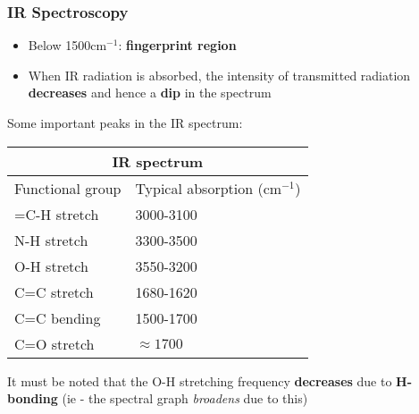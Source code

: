 \documentclass[a4paper]{article}
\begin{document}
\subsubsection{IR Spectroscopy}
\begin{itemize}
    \item Below 1500$\text{cm}^{-1}$: \textbf{fingerprint region}
    \item When IR radiation is absorbed, the intensity of transmitted radiation \textbf{decreases} and hence a \textbf{dip} in the spectrum
\end{itemize}
Some important peaks in the IR spectrum:
\begin{center}
        \begin{tabular}{ |p{3cm}|p{3cm}|  }
             \hline
             \multicolumn{2}{|c|}{IR spectrum} \\
             \hline
             Functional group & Typical absorption ($\text{cm}^{-1}$) \\
             \hline
             =C-H stretch   & 3000-3100 \\
             N-H stretch &   3300-3500  \\
             O-H stretch & 3550-3200 \\
             C=C stretch    & 1680-1620 \\
             C=C bending & 1500-1700  \\
             C=O stretch & $\approx 1700$  \\
             \hline
        \end{tabular}
\end{center}
It must be noted that the O-H stretching frequency \textbf{decreases} due to \textbf{H-bonding} (ie - the spectral graph \textit{broadens} due to this)
\end{document}
